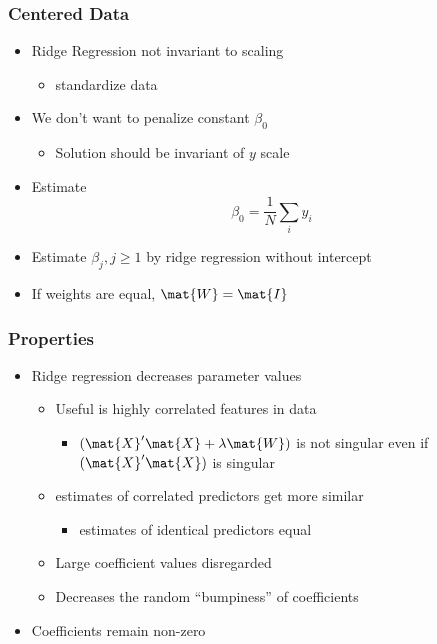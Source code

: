 \documentclass[mathserif, xcolor=table, svgnames]{beamer}
\begin{document}
\begin{frame}
  \frametitle{Centered Data}
  \begin{itemize}
  \item Ridge Regression not invariant to scaling
    \begin{itemize}
    \item standardize data
    \end{itemize}
  \item We don't want to penalize constant $\beta_{0}$
    \begin{itemize}
    \item Solution should be invariant of $y$ scale
    \end{itemize}
  \item Estimate
    \begin{equation*}
      \beta_{0} = \frac{1}{N} \sum_{i} y_{i}
    \end{equation*}
  \item Estimate $\beta_{j}, j \ge 1$ by ridge regression without
    intercept
  \item If weights are equal, $\mat{W} = \mat{I}$
  \end{itemize}
\end{frame}

\begin{frame}
  \frametitle{Properties}
  \begin{itemize}
  \item Ridge regression decreases parameter values
    \begin{itemize}
    \item Useful is highly correlated features in data
      \begin{itemize}
      \item $(\mat{X}' \mat{X} + \lambda \mat{W})$ is not singular
        even if $(\mat{X}' \mat{X})$ is singular
      \end{itemize}
    \item estimates of correlated predictors get more similar
      \begin{itemize}
      \item estimates of identical predictors equal
      \end{itemize}
    \item Large coefficient values disregarded
    \item Decreases the random ``bumpiness'' of coefficients
    \end{itemize}
  \item Coefficients remain non-zero
  \end{itemize}
\end{frame}
\end{document}
